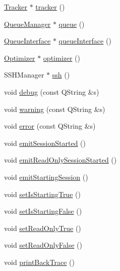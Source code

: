 \begin{DoxyCompactItemize}
\item 
\hyperlink{classGlobalSearch_1_1Tracker}{Tracker} $\ast$ \hyperlink{classGlobalSearch_1_1OptBase_a304d0d10064bd3913c8089aca76067d6}{tracker} ()
\item 
\hyperlink{classGlobalSearch_1_1QueueManager}{Queue\+Manager} $\ast$ \hyperlink{classGlobalSearch_1_1OptBase_aa10982ae8ea63745203a025b2be8054d}{queue} ()
\item 
\hyperlink{classGlobalSearch_1_1QueueInterface}{Queue\+Interface} $\ast$ \hyperlink{classGlobalSearch_1_1OptBase_a73faf60edcd3db57538349f5a636576e}{queue\+Interface} ()
\item 
\hyperlink{classGlobalSearch_1_1Optimizer}{Optimizer} $\ast$ \hyperlink{classGlobalSearch_1_1OptBase_a4dce62d15f24d665c807047aa5c618fc}{optimizer} ()
\item 
S\+S\+H\+Manager $\ast$ \hyperlink{classGlobalSearch_1_1OptBase_a40064a3c1e6d0acae26b1908a8bdf5db}{ssh} ()
\item 
void \hyperlink{classGlobalSearch_1_1OptBase_a3e24cda71c456027edbcab36c9a5e08c}{debug} (const Q\+String \&s)
\item 
void \hyperlink{classGlobalSearch_1_1OptBase_a4f70a04b72a92665b7fb6f8e868b527e}{warning} (const Q\+String \&s)
\item 
void \hyperlink{classGlobalSearch_1_1OptBase_a0069abbd35393e6a5760b049e3497a21}{error} (const Q\+String \&s)
\item 
void \hyperlink{classGlobalSearch_1_1OptBase_ae71d020ca740d76941b66c682eea6986}{emit\+Session\+Started} ()
\item 
void \hyperlink{classGlobalSearch_1_1OptBase_ae1bd90daf659e169a56622d47f6a5be2}{emit\+Read\+Only\+Session\+Started} ()
\item 
void \hyperlink{classGlobalSearch_1_1OptBase_abbcfe0cbb229deb3781b718d175c14c2}{emit\+Starting\+Session} ()
\item 
void \hyperlink{classGlobalSearch_1_1OptBase_aa26f280c771034e15a1579057f4b5735}{set\+Is\+Starting\+True} ()
\item 
void \hyperlink{classGlobalSearch_1_1OptBase_a539171ea69cf4cfe55c08262e4af40f8}{set\+Is\+Starting\+False} ()
\item 
void \hyperlink{classGlobalSearch_1_1OptBase_a8f8fa9427077b974cbfc897089e34115}{set\+Read\+Only\+True} ()
\item 
void \hyperlink{classGlobalSearch_1_1OptBase_a284697394517be5888968af5c7716f6a}{set\+Read\+Only\+False} ()
\item 
void \hyperlink{classGlobalSearch_1_1OptBase_af00d6357f3ed311e9bcd2b03153fc3cc}{print\+Back\+Trace} ()

\end{DoxyCompactItemize}
